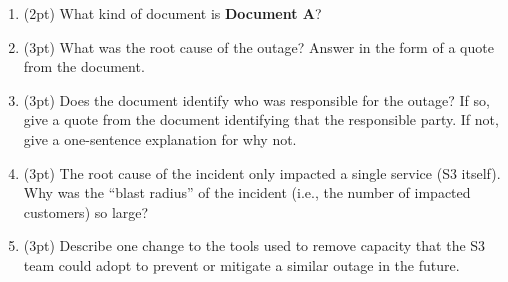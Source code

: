 \documentclass{report}
\newif\ifkey
\newcommand{\answershort}[1]{\ifkey\color{red}\underline{\textbf{#1}}\color{black}\else\underline{\hspace{3in}}\fi\xspace}
\newcommand{\answerlong}[1]{\ifkey\color{red}\textbf{#1}\color{black}\else\vspace{0.5in}\fi\xspace}
\newcommand{\dbqpts}{30}
\newcommand*{\pts}[1]{\addtocounter{points}{#1}(#1pt)}
\begin{document}
\begin{spacing}{1.4}
\begin{enumerate}[leftmargin=*]
    \newpage
    \textbf{IV. Document-based Questions (\dbqpts pts).} All questions in this section refer to a documents \textbf{A-B}.
    These documents appear at the end of the exam (I recommend that you tear them out and refer to them as you answer the questions).

    Questions on this page concern \textbf{Document A}.
    
    \item \pts{2} What kind of document is \textbf{Document A}? \\ \answershort{postmortem}

    \item \pts{3} What was the root cause of the outage? Answer in the form of a quote
      from the document.\\ \answerlong{``one of the inputs to the command was entered incorrectly''}

    \item \pts{3} Does the document identify who was responsible for the outage? If so, give a quote
      from the document identifying that the responsible party. If not, give a one-sentence explanation
      for why not.\\
      \answerlong{The document does not identify who was responsible, because this is a blameless postmortem:
        it blames the system, rather than the individual. (Any answer with ``blameless'' or a synonym will probably be accepted.)}

    \item \pts{3} The root cause of the incident only impacted a single service (S3 itself). Why was the ``blast radius''
      of the incident (i.e., the number of impacted customers) so large?\\
      \answerlong{Other services relied on S3, so a cascading failure caused them to fail, as well.}
      
    \item \pts{3} Describe one change to the tools used to remove capacity that the S3 team could adopt to prevent or mitigate
      a similar outage in the future. \\
      \answerlong{Either of the following two answers, which S3 itself gives in the full postmortem, is acceptable. Other
        sensible answers may also get credit or partial credit. 1) modify the tool to remove capacity more slowly, or
        2) add safeguards to prevent capacity from being removed when it will take any subsystem below its minimum required capacity level}


\end{enumerate}
\end{spacing}
\end{document}
